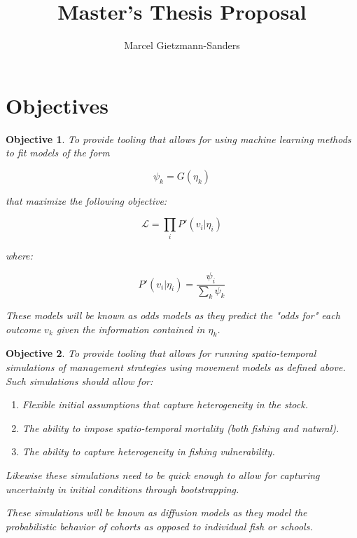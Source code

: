\documentclass[11pt]{article}
\title{Master's Thesis Proposal}
\author{Marcel Gietzmann-Sanders}
\date{}
\newtheorem{objective}{Objective}
\begin{document}
\maketitle
\tableofcontents
\newpage

\section{Objectives}

\begin{objective}
To provide tooling that allows for using machine learning methods to fit models of the form

$$\psi_k = G(\eta_k)$$

that maximize the following objective:


$$\mathcal{L}=\prod_i P'(v_i | \eta_i)$$

where:

$$P'(v_i|\eta_i) = \frac{\psi_i}{\sum_k \psi_k}$$

These models will be known as odds models as they predict the "odds for" each outcome $v_k$ given the information contained in $\eta_k$. 

\end{objective}


\begin{objective}
To provide tooling that allows for running spatio-temporal simulations of management strategies using movement models as defined above. Such simulations should allow for:

\begin{enumerate}
\item Flexible initial assumptions that capture heterogeneity in the stock.
\item The ability to impose spatio-temporal mortality (both fishing and natural).
\item The ability to capture heterogeneity in fishing vulnerability.
\end{enumerate}

Likewise these simulations need to be quick enough to allow for capturing uncertainty in initial conditions through bootstrapping.\newline

These simulations will be known as diffusion models as they model the probabilistic behavior of cohorts as opposed to individual fish or schools. 
\end{objective}


\newpage
\end{document}
